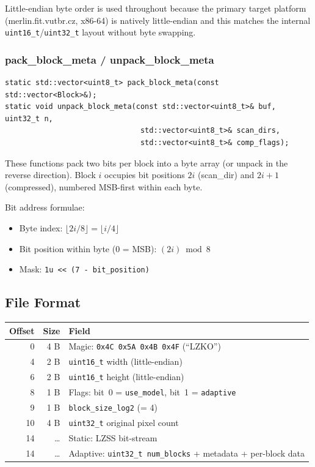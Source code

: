 Little-endian byte order is used throughout because the primary target platform
(merlin.fit.vutbr.cz, x86-64) is natively little-endian and this matches the
internal \texttt{uint16\_t}/\texttt{uint32\_t} layout without byte swapping.

\subsubsection{pack\_block\_meta / unpack\_block\_meta}

\begin{lstlisting}[style=cpp]
static std::vector<uint8_t> pack_block_meta(const std::vector<Block>&);
static void unpack_block_meta(const std::vector<uint8_t>& buf, uint32_t n,
                               std::vector<uint8_t>& scan_dirs,
                               std::vector<uint8_t>& comp_flags);
\end{lstlisting}

These functions pack two bits per block into a byte array
(or unpack in the reverse direction).
Block $i$ occupies bit positions $2i$ (scan\_dir) and $2i+1$ (compressed),
numbered MSB-first within each byte.

Bit address formulae:
\begin{itemize}
  \item Byte index: $\lfloor 2i / 8 \rfloor = \lfloor i / 4 \rfloor$
  \item Bit position within byte (0 = MSB): $(2i) \bmod 8$
  \item Mask: \texttt{1u << (7 - bit\_position)}
\end{itemize}

\subsection{File Format}
\label{sec:file-format}

\begin{center}
\begin{tabular}{r r l}
\toprule
\textbf{Offset} & \textbf{Size} & \textbf{Field} \\
\midrule
0  & 4 B & Magic: \texttt{0x4C 0x5A 0x4B 0x4F} (``LZKO'') \\
4  & 2 B & \texttt{uint16\_t} width (little-endian) \\
6  & 2 B & \texttt{uint16\_t} height (little-endian) \\
8  & 1 B & Flags: bit~0 = \texttt{use\_model}, bit~1 = \texttt{adaptive} \\
9  & 1 B & \texttt{block\_size\_log2} (= 4) \\
10 & 4 B & \texttt{uint32\_t} original pixel count \\
14 & \ldots & Static: LZSS bit-stream \\
14 & \ldots & Adaptive: \texttt{uint32\_t num\_blocks} + metadata + per-block data \\
\bottomrule
\end{tabular}
\end{center}

